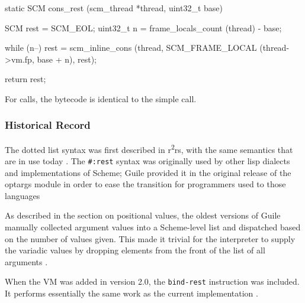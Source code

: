 \begin{pygmented}[lang=c]
static SCM
cons_rest (scm_thread *thread, uint32_t base)
{
  SCM rest = SCM_EOL;
  uint32_t n = frame_locals_count (thread) - base;

  while (n--)
    rest = scm_inline_cons (thread, SCM_FRAME_LOCAL (thread->vm.fp, base + n),
                            rest);

  return rest;
}
\end{pygmented}

For calls, the bytecode is identical to the simple call.

\subsubsection{Historical Record}
The dotted list syntax was first described in r\textsuperscript{2}rs, with the same
semantics that are in use today
\parencite[][page 13]{r2rs}.
The \texttt{\#:rest} syntax was originally used by other lisp dialects and implementations
of Scheme; Guile provided it in the original release of the optargs module in order to
ease the transition for programmers used to those languages
\parencite[][commit 0a852b9424f949575afecb19a391023acc63e635 NEWS lines 849-843]{guile-source}

As described in the section on positional values, the oldest versions of Guile manually
collected argument values into a Scheme-level list and dispatched based on the number of
values given.
This made it trivial for the interpreter to supply the variadic values by dropping
elements from the front of the list of all arguments
\parencite[][libguile/eval.c lines 1652-1655]{guile-first-commit}.

When the VM was added in version 2.0, the \texttt{bind-rest} instruction was included.
It performs essentially the same work as the current implementation
\parencite[][libguile/vm-i-system.c lines 718-732]{guile-2.0}.
